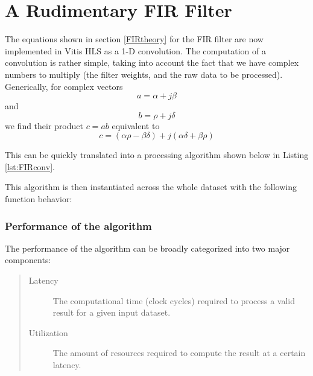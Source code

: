 \documentclass[11pt]{report}
\begin{document}
\chapter{A Rudimentary \ac{FIR} Filter}
The equations shown in section \ref{FIRtheory} for the FIR filter are now implemented in Vitis HLS as a 1-D convolution. The computation of a convolution is rather simple, taking into account the fact that we have complex numbers to multiply (the filter weights, and the raw data to be processed). Generically, for complex vectors
\begin{equation}
	a = \alpha + j\beta
\end{equation}
and 
\begin{equation}
	b = \rho + j\delta
\end{equation}
we find their product $c = ab$ equivalent to
\begin{equation}
	c = (\alpha\rho - \beta\delta) + j(\alpha\delta+\beta\rho)
\end{equation}

This can be quickly translated into a processing algorithm shown below in Listing \ref{lst:FIRconv}.

\begin{singlespace}
    
\end{singlespace}

This algorithm is then instantiated across the whole dataset with the following function behavior:

\begin{singlespace}
    
\end{singlespace}

\subsection{Performance of the algorithm}
The performance of the algorithm can be broadly categorized into two major components:

\begin{quote}
\begin{description}
	\item [Latency] The computational time (clock cycles) required to process a valid result for a given input dataset.
	\item [Utilization] The amount of resources required to compute the result at a certain latency.
\end{description}
\end{quote}
\end{document}
